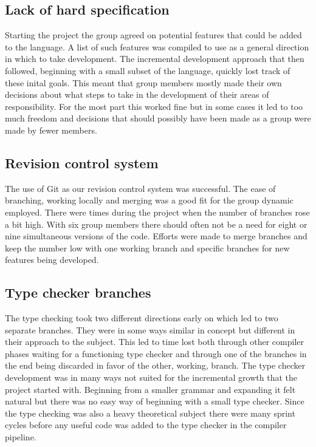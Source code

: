 \subsection{Lack of hard specification}

Starting the project the group agreed on potential features that could be added to the language. A list of such features was compiled to use as a general direction in which to take development. The incremental development approach that then followed, beginning with a small subset of the language, quickly lost track of these inital goals. This meant that group members mostly made their own decisions about what steps to take in the development of their areas of responsibility. For the most part this worked fine but in some cases it led to too much freedom and decisions that should possibly have been made as a group were made by fewer members.

\subsection{Revision control system}

The use of Git as our revision control system was successful. The ease of branching, working locally and merging was a good fit for the group dynamic employed. 
There were times during the project when the number of branches rose a bit high. With six group members there should often not be a need for eight or nine simultaneous versions of the code. Efforts were made to merge branches and keep the number low with one working branch and specific branches for new features being developed.

\subsection{Type checker branches}


The type checking took two different directions early on which led to two separate branches. They were in some ways similar in concept but different in their approach to the subject. This led to time lost both through other compiler phases waiting for a functioning type checker and through one of the branches in the end being discarded in favor of the other, working, branch. The type checker development was in many ways not suited for the incremental growth that the project started with. Beginning from a smaller grammar and expanding it felt natural but there was no easy way of beginning with a small type checker. Since the type checking was also a heavy theoretical subject there were many sprint cycles before any useful code was added to the type checker in the compiler pipeline. 

